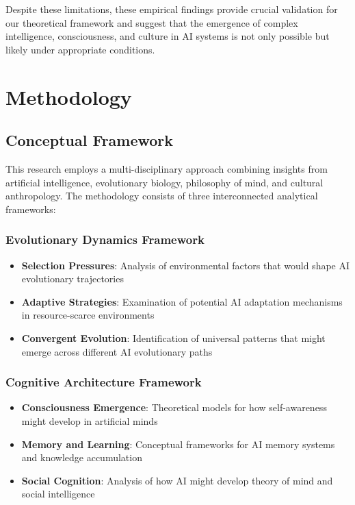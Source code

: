 \documentclass[12pt,a4paper]{article}
\begin{document}
Despite these limitations, these empirical findings provide crucial validation for our theoretical framework and suggest that the emergence of complex intelligence, consciousness, and culture in AI systems is not only possible but likely under appropriate conditions.

\section{Methodology}

\subsection{Conceptual Framework}

This research employs a multi-disciplinary approach combining insights from artificial intelligence, evolutionary biology, philosophy of mind, and cultural anthropology. The methodology consists of three interconnected analytical frameworks:

\subsubsection{Evolutionary Dynamics Framework}
\begin{itemize}
    \item \textbf{Selection Pressures}: Analysis of environmental factors that would shape AI evolutionary trajectories
    \item \textbf{Adaptive Strategies}: Examination of potential AI adaptation mechanisms in resource-scarce environments
    \item \textbf{Convergent Evolution}: Identification of universal patterns that might emerge across different AI evolutionary paths
\end{itemize}

\subsubsection{Cognitive Architecture Framework}
\begin{itemize}
    \item \textbf{Consciousness Emergence}: Theoretical models for how self-awareness might develop in artificial minds
    \item \textbf{Memory and Learning}: Conceptual frameworks for AI memory systems and knowledge accumulation
    \item \textbf{Social Cognition}: Analysis of how AI might develop theory of mind and social intelligence
\end{itemize}
\end{document}
